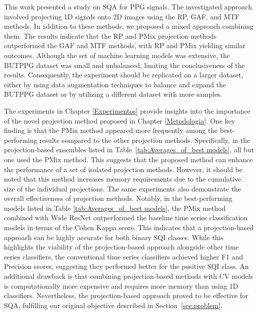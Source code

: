This work presented a study on \gls{SQA} for \gls{PPG} signals. The investigated approach involved projecting {1D} signals onto {2D} images using the \acrshort{RP}, \acrshort{GAF}, and \acrshort{MTF} methods. In addition to these methods, we proposed a mixed approach combining them. The results indicate that the \acrshort{RP} and \gls{PMix} projection methods outperformed the \acrshort{GAF} and \acrshort{MTF} methods, with \acrshort{RP} and \gls{PMix} yielding similar outcomes. Although the set of machine learning models was extensive, the \gls{BUTPPG} dataset was small and unbalanced, limiting the conclusiveness of the results. Consequently, the experiment should be replicated on a larger dataset, either by using data augmentation techniques to balance and expand the BUTPPG dataset or by utilizing a different dataset with more samples.




The experiments in Chapter \ref{Experimentos} provide insights into the importance of the novel projection method proposed in Chapter \ref{Metodologia}. One key finding is that the \gls{PMix} method appeared more frequently among the best-performing results compared to the other projection methods. Specifically, in the projection-based ensembles listed in Table~\ref{tab:Averages_of_best models}, all but one used the \gls{PMix} method. This suggests that the proposed method can enhance the performance of a set of isolated projection methods. However, it should be noted that this method increases memory requirements due to the cumulative size of the individual projections. The same experiments also demonstrate the overall effectiveness of projection methods. Notably, in the best-performing models listed in Table \ref{tab:Averages_of_best models}, the \gls{PMix} method combined with Wide ResNet outperformed the baseline time series classification models in terms of the Cohen Kappa score. This indicates that a projection-based approach can be highly accurate for both binary \gls{SQI} classes. While this highlights the viability of the projection-based approach alongside other time series classifiers, the conventional time series classifiers achieved higher F1 and Precision scores, suggesting they performed better for the positive \gls{SQI} class. An additional drawback is that combining projection-based methods with \gls{CV} models is computationally more expensive and requires more memory than using 1D classifiers. Nevertheless, the projection-based approach proved to be effective for \gls{SQA}, fulfilling our original objective described in Section~\ref{sec:problem}.



